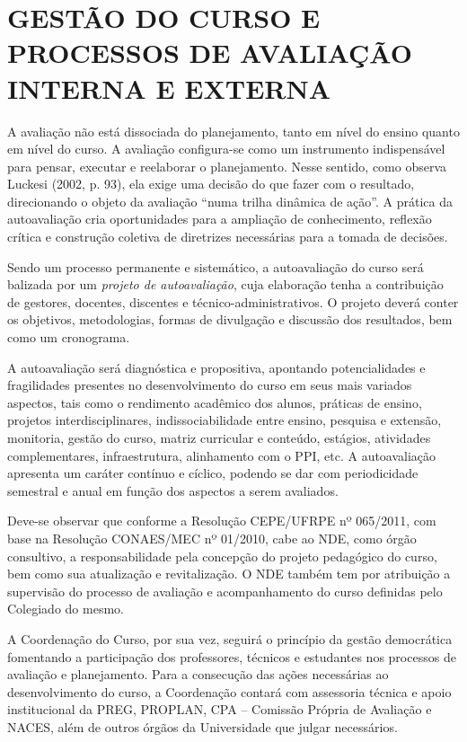 \chapter{GESTÃO DO CURSO E PROCESSOS DE AVALIAÇÃO INTERNA E EXTERNA}

A avaliação não está dissociada do planejamento, tanto em nível do ensino quanto em nível do curso. A avaliação configura-se como um instrumento indispensável para pensar, executar e reelaborar o planejamento. Nesse sentido, como observa Luckesi (2002, p. 93), ela exige uma decisão do que fazer com o resultado, direcionando o objeto da avaliação “numa trilha dinâmica de ação”. A prática da autoavaliação cria oportunidades para a ampliação de conhecimento, reflexão crítica e construção coletiva de diretrizes necessárias para a tomada de decisões.

Sendo um processo permanente e sistemático, a autoavaliação do curso será balizada por um \textit{projeto de autoavaliação}, cuja elaboração tenha a contribuição de gestores, docentes, discentes e técnico-administrativos. O projeto deverá conter os objetivos, metodologias, formas de divulgação e discussão dos resultados, bem como um cronograma.

A autoavaliação será diagnóstica e propositiva, apontando potencialidades e fragilidades presentes no desenvolvimento do curso em seus mais variados aspectos, tais como o rendimento acadêmico dos alunos, práticas de ensino, projetos interdisciplinares, indissociabilidade entre ensino, pesquisa e extensão, monitoria, gestão do curso, matriz curricular e conteúdo, estágios, atividades complementares, infraestrutura, alinhamento com o PPI, etc. A autoavaliação apresenta um caráter contínuo e cíclico, podendo se dar com periodicidade semestral e anual em função dos aspectos a serem avaliados.

Deve-se observar que conforme a Resolução CEPE/UFRPE nº 065/2011, com base na Resolução CONAES/MEC nº 01/2010, cabe ao NDE, como órgão consultivo, a responsabilidade pela concepção do projeto pedagógico do curso, bem como sua atualização e revitalização. O NDE também tem por atribuição a supervisão do processo de avaliação e acompanhamento do curso definidas pelo Colegiado do mesmo.

A Coordenação do Curso, por sua vez, seguirá o princípio da gestão democrática fomentando a participação dos professores, técnicos e estudantes nos processos de avaliação e planejamento. Para a consecução das ações necessárias ao desenvolvimento do curso, a Coordenação contará com assessoria técnica e apoio institucional da PREG, PROPLAN, CPA – Comissão Própria de Avaliação e NACES, além de outros órgãos da Universidade que julgar necessários.

